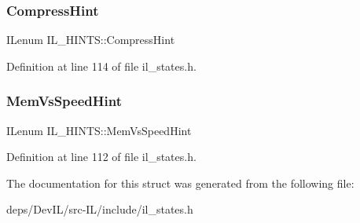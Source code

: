 \subsubsection{\texorpdfstring{Compress\+Hint}{CompressHint}}
{\footnotesize\ttfamily I\+Lenum I\+L\+\_\+\+H\+I\+N\+T\+S\+::\+Compress\+Hint}



Definition at line 114 of file il\+\_\+states.\+h.

\mbox{\label{structIL__HINTS_a9ffff1d75274131973d0d51c6f9705ab}} 
\subsubsection{\texorpdfstring{Mem\+Vs\+Speed\+Hint}{MemVsSpeedHint}}
{\footnotesize\ttfamily I\+Lenum I\+L\+\_\+\+H\+I\+N\+T\+S\+::\+Mem\+Vs\+Speed\+Hint}



Definition at line 112 of file il\+\_\+states.\+h.



The documentation for this struct was generated from the following file\+:\begin{DoxyCompactItemize}
\item 
deps/\+Dev\+I\+L/src-\/\+I\+L/include/il\+\_\+states.\+h\end{DoxyCompactItemize}
